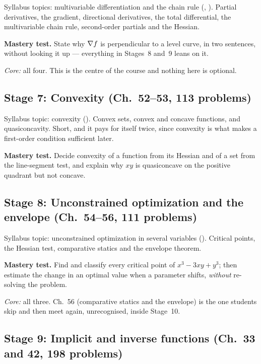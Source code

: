 Syllabus topics: multivariable differentiation and the chain rule
(, ).
Partial derivatives, the gradient,
directional derivatives, the total differential, the multivariable chain
rule, second-order partials and the Hessian.

\textbf{Mastery test.} State why $\nabla f$ is perpendicular to a level
curve, in two sentences, without looking it up --- everything in Stages~8
and~9 leans on it.

\emph{Core:} all four. This is the centre of the course and nothing here is
optional.

\subsection*{Stage 7: Convexity (Ch.~52--53, 113 problems)}

Syllabus topic: convexity (). Convex sets, convex and
concave functions, and quasiconcavity. Short, and it pays for itself twice, since
convexity is what makes a first-order condition sufficient later.

\textbf{Mastery test.} Decide convexity of a function from its Hessian and
of a set from the line-segment test, and explain why $xy$ is quasiconcave on
the positive quadrant but not concave.

\subsection*{Stage 8: Unconstrained optimization and the envelope (Ch.~54--56, 111 problems)}

Syllabus topic: unconstrained optimization in several variables
(). Critical points, the Hessian
test, comparative statics and the envelope theorem.

\textbf{Mastery test.} Find and classify every critical point of
$x^{3}-3xy+y^{3}$; then estimate the change in an optimal value when a
parameter shifts, \emph{without} re-solving the problem.

\emph{Core:} all three. Ch.~56 (comparative statics and the envelope) is the
one students skip and then meet again, unrecognised, inside Stage~10.

\subsection*{Stage 9: Implicit and inverse functions (Ch.~33 and 42, 198 problems)}

